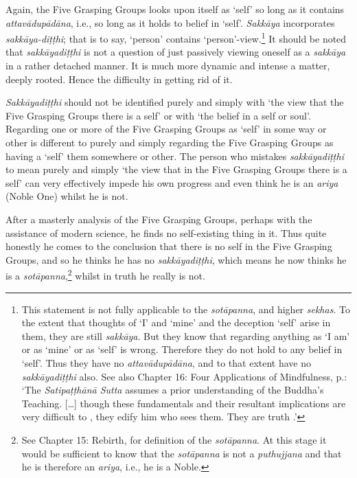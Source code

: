 Again, the Five Grasping Groups looks upon itself as `self' so long as it contains \emph{attavādupādāna}, i.e., so long as it holds to belief in `self'. \emph{Sakkāya} incorporates \emph{sakkāya-diṭṭhi}; that is to say, `person'
\clearpage
contains `person'-view.\footnote{This statement is not fully applicable to the \emph{sotāpanna}, and higher \emph{sekhas}. To the extent that thoughts of `I' and `mine' and the deception `self' arise in them, they are still \emph{sakkāya}. But they know that regarding anything as `I am' or as `mine' or as `self' is wrong. Therefore they do not hold to any belief in `self'. Thus they have no \emph{attavādupādāna}, and to that extent have no \emph{sakkāyadiṭṭhi} also. See also Chapter 16: Four Applications of Mindfulness, p.\pageref{ch-16-truth-for-him}: `The \emph{Satipaṭṭhānā Sutta} assumes a prior understanding of the Buddha's Teaching. [\ldots{}] though these fundamentals and their resultant implications are very difficult to , they edify him who sees them. They are truth .'} It should be noted that \emph{sakkāyadiṭṭhi} is not a question of just passively viewing oneself as a \emph{sakkāya} in a rather detached manner. It is much more dynamic and intense a matter, deeply rooted. Hence the difficulty in getting rid of it.

\emph{Sakkāyadiṭṭhi} should not be identified purely and simply with `the view that  the Five Grasping Groups there is a self' or with `the belief in a self or soul'. Regarding one or more of the Five Grasping Groups as `self' in some way or other is different to purely and simply regarding the Five Grasping Groups as having a `self'  them somewhere or other. The person who mistakes \emph{sakkāyadiṭṭhi} to mean purely and simply `the view that in the Five Grasping Groups there is a self' can very effectively impede his own progress and even think he is an \emph{ariya} (Noble One) whilst he is not.

After a masterly analysis of the Five Grasping Groups, perhaps with the assistance of modern science, he finds no self-existing thing in it. Thus quite honestly he comes to the conclusion that there is no self in the Five Grasping Groups, and so he thinks he has no \emph{sakkāyadiṭṭhi}, which means he now thinks he is a \emph{sotāpanna},\footnote{See Chapter 15: Rebirth, for definition of the \emph{sotāpanna}. At this stage it would be sufficient to know that the \emph{sotāpanna} is not a \emph{puthujjana} and that he is therefore an \emph{ariya}, i.e., he is a Noble.} whilst in truth he really is not.

